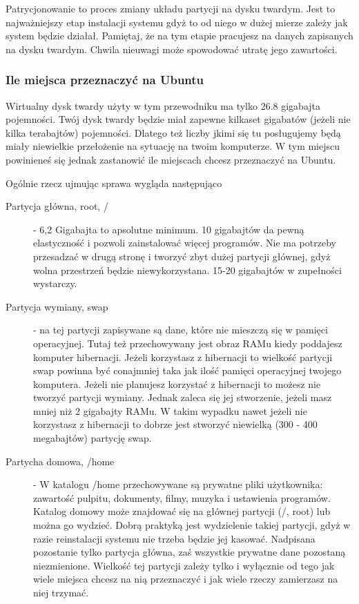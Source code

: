\label{subsec:partycjonowanie}
Patrycjonowanie to proces zmiany układu partycji na dysku twardym. Jest to najważniejszy etap instalacji systemu gdyż to od niego w dużej mierze zależy jak system będzie działał. Pamiętaj, że na tym etapie pracujesz na danych zapisanych na dysku twardym. Chwila nieuwagi może spowodować utratę jego zawartości.
\subsubsection{Ile miejsca przeznaczyć na Ubuntu}
\label{subsubsec:ile_miejsca}
Wirtualny dysk twardy użyty w tym przewodniku ma tylko 26.8 gigabajta pojemności. Twój dysk twardy będzie miał zapewne kilkaset gigabatów (jeżeli nie kilka terabajtów) pojemności. Dlatego też liczby jkimi się tu posługujemy będą miały niewielkie przełożenie na sytuację na twoim komputerze. W tym miejscu powinieneś się jednak zastanowić ile miejscach chcesz przeznaczyć na Ubuntu.

Ogólnie rzecz ujmując sprawa wygląda następująco
\begin{description}
\item[Partycja główna, root, /] - 6,2 Gigabajta to apsolutne minimum. 10 gigabajtów da pewną elastyczność i pozwoli zainstalować więcej programów. Nie ma potrzeby przesadzać w drugą stronę i tworzyć zbyt dużej partycji głównej, gdyż wolna przestrzeń będzie niewykorzystana. 15-20 gigabajtów w zupełności wystarczy.
\item[Partycja wymiany, swap] - na tej partycji zapisywane są dane, które nie mieszczą się w pamięci operacyjnej. Tutaj też przechowywany jest obraz RAMu kiedy poddajesz komputer hibernacji. Jeżeli korzystasz z hibernacji to wielkość partycji swap powinna być conajmniej taka jak ilość pamięci operacyjnej twojego komputera. Jeżeli nie planujesz korzystać z hibernacji to możesz nie tworzyć partycji wymiany. Jednak zaleca się jej stworzenie, jeżeli masz mniej niż 2 gigabajty RAMu. W takim wypadku nawet jeżeli nie korzystasz z hibernacji to dobrze jest stworzyć niewielką (300 - 400 megabajtów) partycję swap.
\item[Partycha domowa, /home] - W katalogu /home przechowywane są prywatne pliki użytkownika: zawartość pulpitu, dokumenty, filmy, muzyka i ustawienia programów. Katalog domowy może znajdować się na głównej partycji (/, root) lub można go wydzieć. Dobrą praktyką jest wydzielenie takiej partycji, gdyż w razie reinstalacji systemu nie trzeba będzie jej kasować. Nadpisana pozostanie tylko partycja główna, zaś wszystkie prywatne dane pozostaną niezmienione. Wielkość tej partycji zależy tylko i wyłącznie od tego jak wiele miejsca chcesz na nią przeznaczyć i jak wiele rzeczy zamierzasz na niej trzymać. 
\end{description}
\clearpage
